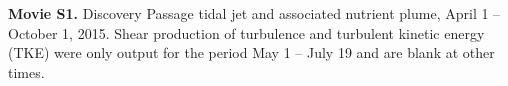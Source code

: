 \documentclass[draft,jgrga]{agutexSI2019}
\begin{document}
\begin{article}
\noindent\textbf{Movie S1.}
Discovery Passage tidal jet and associated nutrient plume, April 1 -- October 1, 2015. Shear production of turbulence and turbulent kinetic energy (TKE) were only output for the period May 1 -- July 19 and are blank at other times. 



%
%
\clearpage



% 
%
%
%
%

%  




%
%
%
%
%

%
%
\end{article}
\clearpage
\end{document}
